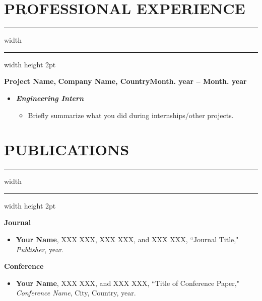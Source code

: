 \documentclass[12pt]{article}
\begin{document}
	\vspace{-4mm}
	\section*{\textbf{\Large P}\normalsize ROFESSIONAL {\Large E}\normalsize XPERIENCE}
	\vspace{-2mm}
	\hrule width \hsize \kern 1mm \hrule width \hsize height 2pt
	\vspace{2mm}

	\begin{flushleft}
		\textbf{Project Name,}
		\textbf{Company Name, Country}\hspace{100pt}\textbf{Month. year -- Month. year}
	\end{flushleft}
	\vspace{-8mm}
	\begin{itemize}\setlength{\leftskip}{-5mm}
		\item[] \textit{\textbf{Engineering Intern}}
		\vspace{-3mm}
		\begin{itemize}
			\setlength{\leftskip}{-5mm}
			\setlength{\itemsep}{-1mm}
			\item Briefly summarize what you did during internships/other projects.
			\end{itemize}
	\end{itemize}
	\vspace{-4mm}
	\section*{\textbf{\Large P}\normalsize UBLICATIONS}
	\vspace{-2mm}
	\hrule width \hsize \kern 1mm \hrule width \hsize height 2pt
	\vspace{2mm}
	\begin{flushleft}
		\textbf{Journal}
	\end{flushleft}
	\vspace{-8mm}
	\begin{itemize}
		\setlength{\leftskip}{-5mm}
		\setlength{\itemsep}{-1mm}
		\item \textbf{Your Name}, XXX XXX, XXX XXX, and XXX XXX, ``Journal Title," \textit{Publisher}, year.
	\end{itemize}
	\vspace{-8mm}
	\begin{flushleft}
		\textbf{Conference}
	\end{flushleft}
	\vspace{-8mm}
	\begin{itemize}
		\setlength{\leftskip}{-5mm}
		\setlength{\itemsep}{-1mm}
		\item \textbf{Your Name}, XXX XXX, and XXX XXX, ``Title of Conference Paper," \textit{Conference Name}, City, Country, year.
	\end{itemize}
\end{document}

